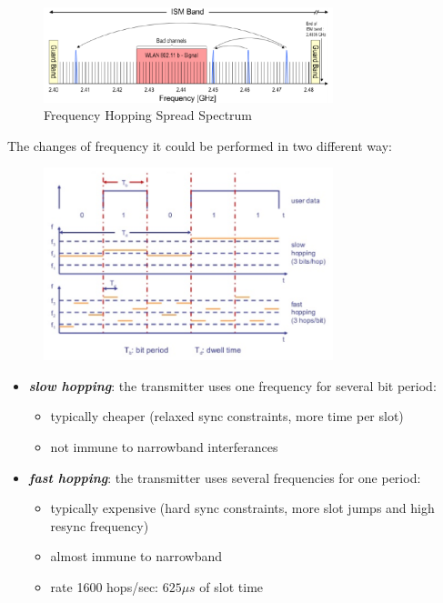 \begin{figure}[h]
    \centering
    \includegraphics[width=0.75\textwidth]{img/ble_fhss}
    \caption{Frequency Hopping Spread Spectrum}
\end{figure}
The changes of frequency it could be performed in two different way:

\begin{figure}[h]
    \centering
    \includegraphics[width=0.75\textwidth]{img/ble_hop}
\end{figure}
\begin{itemize}[nosep]
    
    \item \textbf{\textit{slow hopping}}: the transmitter uses one frequency for several bit period:
    \begin{itemize}[nosep]
        \item typically cheaper (relaxed sync constraints, more time per slot)
        \item not immune to narrowband interferances
    \end{itemize}
    
    \item \textbf{\textit{fast hopping}}: the transmitter uses several frequencies for one period:
    \begin{itemize}[nosep]
        \item typically expensive (hard sync constraints, more slot jumps and high resync frequency)
        \item almost immune to narrowband
        \item rate 1600 hops/sec: $625 \mu s$ of slot time
    \end{itemize}

\end{itemize}
